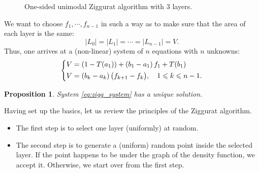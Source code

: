 \documentclass{article}
\renewcommand{\leq}{\leqslant}
\newtheorem{proposition}{Proposition}
\theoremstyle{definition} %
\newcommand{\Mode}{\theta}
\begin{document}
\begin{figure}[!ht]
    \caption{One-sided unimodal Ziggurat algorithm with $3$ layers.}
    \label{fig:ziggurat:3_layers}
\end{figure}
%
We want to choose $f_1, \cdots , f_{n - 1}$ in such a way as to make sure that the area of each layer is the same:
\[
    |L_0| = |L_1| = \cdots = |L_{n - 1}| = V.
\]
Thus, one arrives at a (non-linear) system of $n$ equations with $n$ unknowns:
\begin{align} \label{eq:zigg_system}
    \begin{dcases}
        V = (1 - T(a_1)) + (b_1 - a_1) \, f_1 + T(b_1) \\
        V = (b_k - a_k) \, \big( f_{k + 1} - f_k \big), \quad 1 \leq k \leq n - 1.
    \end{dcases}
\end{align}

\begin{proposition}
    System \eqref{eq:zigg_system} has a unique solution.
\end{proposition}

Having set up the basics, let us review the principles of the Ziggurat algorithm.
\begin{itemize}
    \item The first step is to select one layer (uniformly) at random.
    \item The second step is to generate a (uniform) random point inside the selected layer. If the point happens to be under the graph of the density function, we accept it. Otherwise, we start over from the first step.
\end{itemize}
\end{document}
